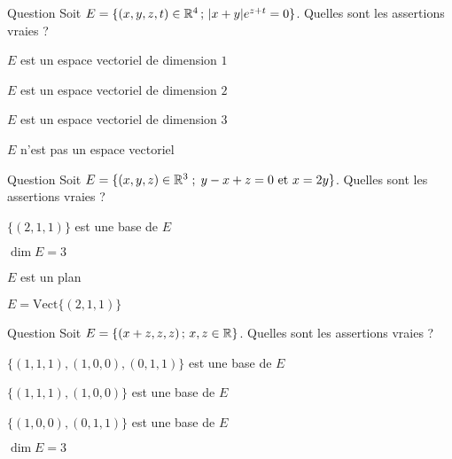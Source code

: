 \begin{multi}[multiple,feedback=
{On vérifie que : \(E=\{(x,y,z,t) \in \Rr^4 \, ; \, x+y=0\}=\mbox {Vect} \{v_1,v_2,v_3\}\), où \(v_1=(1,-1,0,0)\), \(v_2=(0,0,1,0)\) et \(v_3=(0,0,0,1)\). On vérifie que cette famille est libre et donc c'est une base de \(E\). Par conséquent, la dimension de \(E\) est \(3\).
}]{Question}
Soit \(E=\{(x,y,z,t) \in \mathbb{R}^4 \, ; \, |x+y|e^{z+t}=0\}\). Quelles sont les assertions vraies ?

    \item \(E\) est un espace vectoriel de dimension \(1\)
    \item \(E\) est un espace vectoriel de dimension \(2\)
    \item* \(E\) est un espace vectoriel de dimension \(3\)
    \item \(E\) n'est pas un espace vectoriel
\end{multi}


\begin{multi}[multiple,feedback=
{\(E\) est un sous-espace vectoriel de \(  \Rr^3\) défini par  un système d'équations linéaires homogènes de rang \(2\), donc \(\dim E= 3-2=1\). Comme \((2,1,1)\) est un vecteur non nul de \(E\) et \(\dim E=1\), \(\{(2,1,1)\}\) est une base de \(E\).
}]{Question}
Soit \(E=\{(x,y,z) \in \mathbb{R}^3\; ;\; y-x+z=0\mbox{ et }x=2y\}\). 
Quelles sont les assertions vraies ?

    \item* \(\{(2,1,1)\}\) est une base de \(E\)
    \item \(\dim E = 3\)
    \item \(E\) est un plan
    \item* \(E=\mbox {Vect}\{(2,1,1)\}\)
\end{multi}


\begin{multi}[multiple,feedback=
{On vérifie que : \(E= \mbox {Vect}\{(1,0,0), (1,1,1)\}\). Comme ces deux vecteurs ne sont pas colinéaires, ils forment une base de \(E\) et donc \(\dim E = 2\).
}]{Question}
Soit \(E=\{(x+z,z,z) \,  ; \, x,z \in \mathbb{R}\}\). 
Quelles sont les assertions vraies ?

    \item \(\{(1,1,1), (1,0,0),(0,1,1) \} \) est une base de \(E\)
    \item* \(\{(1,1,1),(1,0,0)\} \) est une base de \(E\)
    \item* \(\{(1,0,0),(0,1,1)\} \) est une base de \(E\)
    \item \(\dim E = 3\)
\end{multi}


